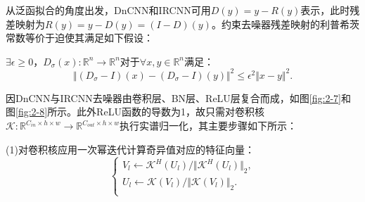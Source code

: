 从泛函拟合的角度出发，DnCNN和IRCNN可用$D(y)=y-R(y)$表示，此时残差映射为$R(y)=y-D(y)=(I-D)(y)$。约束去噪器残差映射的利普希茨常数等价于迫使其满足如下假设：
\begin{assumption} \label{assumption:3-1}
	$\exists{\epsilon\ge{0}}$，$D_{\sigma}(x)\colon\mathbb{R}^n\to\mathbb{R}^n$对于$\forall{x,y}\in\mathbb{R}^n$满足：
	\begin{equation} 
		\Vert{(D_\sigma-I)(x)-(D_\sigma-I)(y)}\Vert^2\leq{\epsilon^2\Vert{x-y}\Vert^2}.
	\end{equation}	
\end{assumption}
因DnCNN与IRCNN去噪器由卷积层、BN层、ReLU层复合而成，如图\ref{fig:2-7}和图\ref{fig:2-8}所示。此外ReLU函数的导数为1，故只需对卷积核$\mathcal{K}:\mathbb{R}^{C_{in}\times{h}\times{w}}\to{\mathbb{R}^{C_{out}\times{h}\times{w}}}$执行实谱归一化，其主要步骤如下所示：

(1)对卷积核应用一次幂迭代计算奇异值对应的特征向量：
\begin{equation} \label{equation:3-1}
	\begin{cases}
		V_{l}\leftarrow{\mathcal{K^\mathit{H}}(U_l)/\Vert{\mathcal{K^\mathit{H}}(U_l)}\Vert_2},\\
		U_{l}\leftarrow{\mathcal{K}(V_l)/\Vert{\mathcal{K}(V_l)}\Vert_2}.\\
	\end{cases}
\end{equation}

